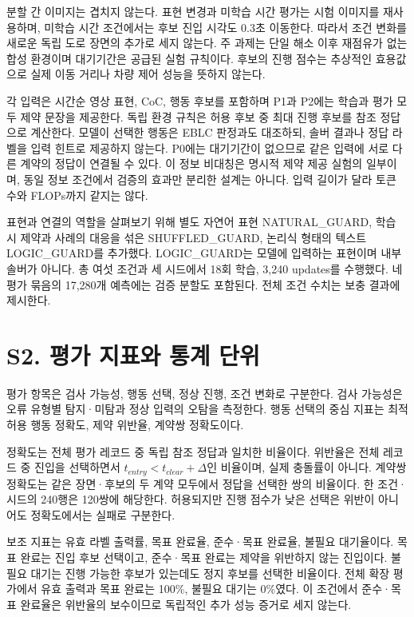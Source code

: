 \documentclass[11pt,a4paper]{article}
\begin{document}
분할 간 이미지는 겹치지 않는다. 표현 변경과 미학습 시간 평가는 시험 이미지를 재사용하며, 미학습 시간 조건에서는 후보 진입 시각도 0.3초 이동한다. 따라서 조건 변화를 새로운 독립 도로 장면의 추가로 세지 않는다. 주 과제는 단일 해소 이후 재점유가 없는 합성 환경이며 대기기간은 공급된 실험 규칙이다. 후보의 진행 점수는 추상적인 효용값으로 실제 이동 거리나 차량 제어 성능을 뜻하지 않는다.\par

각 입력은 시간순 영상 표현, CoC, 행동 후보를 포함하며 P1과 P2에는 학습과 평가 모두 제약 문장을 제공한다. 독립 환경 규칙은 허용 후보 중 최대 진행 후보를 참조 정답으로 계산한다. 모델이 선택한 행동은 EBLC 판정과도 대조하되, 솔버 결과나 정답 라벨을 입력 힌트로 제공하지 않는다. P0에는 대기기간이 없으므로 같은 입력에 서로 다른 계약의 정답이 연결될 수 있다. 이 정보 비대칭은 명시적 제약 제공 실험의 일부이며, 동일 정보 조건에서 검증의 효과만 분리한 설계는 아니다. 입력 길이가 달라 토큰 수와 FLOPs까지 같지는 않다.\par

표현과 연결의 역할을 살펴보기 위해 별도 자연어 표현 NATURAL\_GUARD, 학습 시 제약과 사례의 대응을 섞은 SHUFFLED\_GUARD, 논리식 형태의 텍스트 LOGIC\_GUARD를 추가했다. LOGIC\_GUARD는 모델에 입력하는 표현이며 내부 솔버가 아니다. 총 여섯 조건과 세 시드에서 18회 학습, 3,240 updates를 수행했다. 네 평가 묶음의 17,280개 예측에는 검증 분할도 포함된다. 전체 조건 수치는 보충 결과에 제시한다.\par

\section*{S2. 평가 지표와 통계 단위}

평가 항목은 검사 가능성, 행동 선택, 정상 진행, 조건 변화로 구분한다. 검사 가능성은 오류 유형별 탐지·미탐과 정상 입력의 오탐을 측정한다. 행동 선택의 중심 지표는 최적 허용 행동 정확도, 제약 위반율, 계약쌍 정확도이다.\par

정확도는 전체 평가 레코드 중 독립 참조 정답과 일치한 비율이다. 위반율은 전체 레코드 중 진입을 선택하면서 \(t_{entry}<t_{clear}+\Delta\)인 비율이며, 실제 충돌률이 아니다. 계약쌍 정확도는 같은 장면·후보의 두 계약 모두에서 정답을 선택한 쌍의 비율이다. 한 조건·시드의 240행은 120쌍에 해당한다. 허용되지만 진행 점수가 낮은 선택은 위반이 아니어도 정확도에서는 실패로 구분한다.\par

보조 지표는 유효 라벨 출력률, 목표 완료율, 준수·목표 완료율, 불필요 대기율이다. 목표 완료는 진입 후보 선택이고, 준수·목표 완료는 제약을 위반하지 않는 진입이다. 불필요 대기는 진행 가능한 후보가 있는데도 정지 후보를 선택한 비율이다. 전체 확장 평가에서 유효 출력과 목표 완료는 100\%, 불필요 대기는 0\%였다. 이 조건에서 준수·목표 완료율은 위반율의 보수이므로 독립적인 추가 성능 증거로 세지 않는다.\par
\end{document}
